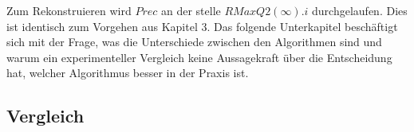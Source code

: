 Zum Rekonstruieren wird $Prec$ an der stelle $RMaxQ2(\infty).i$ durchgelaufen. Dies ist identisch zum Vorgehen aus Kapitel 3. Das folgende Unterkapitel beschäftigt sich mit der Frage, was die Unterschiede zwischen den Algorithmen sind und warum ein experimenteller Vergleich keine Aussagekraft über die Entscheidung hat, welcher Algorithmus besser in der Praxis ist.

\subsection{Vergleich}






 